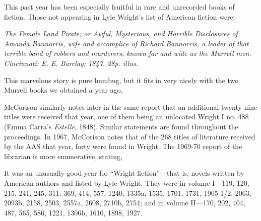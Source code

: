 \begin{displayquote}
This past year has been especially fruitful in rare and
unrecorded books of fiction. Those not appearing in Lyle
Wright's list of American fiction were:

\textit{The Female Land Pirate; or Awful, Mysterious, and Horrible Disclosures of Amanda Bannorris, wife and accomplice of Richard Bannorris, a leader of that terrible band of robbers and murderers, known far and wide as the
Murrell men. Cincinnati: E. E. Barclay; 1847. 28p. illus.}

This marvelous story is pure humbug, but it fits in very
nicely with the two Murrell books we obtained a year ago.\autocite[243]{marcus_a._mccorison_report_1965}
\end{displayquote}

McCorison similarly notes later in the same report that an additional twenty-nine titles were received that year, one of them being an unlocated Wright I no. 488 (Emma Carra's \textit{Estelle}, 1848).\autocite[244]{marcus_a._mccorison_report_1965} Similar statements are found throughout the proceedings. In 1967, McCorison notes that of the 268 titles of literature received by the AAS that year, forty were found in Wright.\autocite[237]{marcus_a._mccorison_report_1967} The 1969-70 report of the librarian is more enumerative, stating,
\begin{displayquote}
It was an unusually good year for ``Wright fiction''—that is, novels written by American authors and listed by Lyle
Wright. They were in volume I—119, 120, 215, 241, 245,
311, 369, 414, 557, 1240, 1335a, 1535, 1701, 1731, 1905 1/2, 2063, 2093b, 2158, 2503, 2557a, 2608, 2710b, 2754; and in volume II—170, 202, 404, 487, 565, 586, 1221, 1306b, 1610, 1898, 1927.\autocite[277]{marcus_a._mccorison_report_1970}
\end{displayquote}
